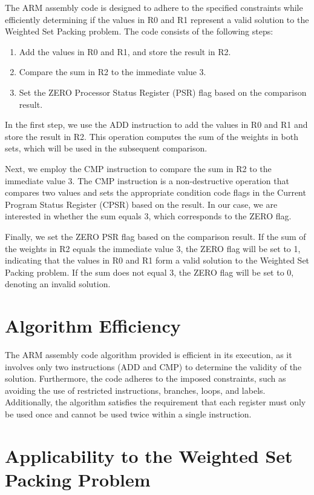 The ARM assembly code is designed to adhere to the specified constraints while efficiently determining if the values in R0 and R1 represent a valid solution to the Weighted Set Packing problem. The code consists of the following steps:

\begin{enumerate}
    \item Add the values in R0 and R1, and store the result in R2.
    \item Compare the sum in R2 to the immediate value 3.
    \item Set the ZERO Processor Status Register (PSR) flag based on the comparison result.
\end{enumerate}

In the first step, we use the ADD instruction to add the values in R0 and R1 and store the result in R2. This operation computes the sum of the weights in both sets, which will be used in the subsequent comparison.

Next, we employ the CMP instruction to compare the sum in R2 to the immediate value 3. The CMP instruction is a non-destructive operation that compares two values and sets the appropriate condition code flags in the Current Program Status Register (CPSR) based on the result. In our case, we are interested in whether the sum equals 3, which corresponds to the ZERO flag.

Finally, we set the ZERO PSR flag based on the comparison result. If the sum of the weights in R2 equals the immediate value 3, the ZERO flag will be set to 1, indicating that the values in R0 and R1 form a valid solution to the Weighted Set Packing problem. If the sum does not equal 3, the ZERO flag will be set to 0, denoting an invalid solution.

\section{Algorithm Efficiency}

The ARM assembly code algorithm provided is efficient in its execution, as it involves only two instructions (ADD and CMP) to determine the validity of the solution. Furthermore, the code adheres to the imposed constraints, such as avoiding the use of restricted instructions, branches, loops, and labels. Additionally, the algorithm satisfies the requirement that each register must only be used once and cannot be used twice within a single instruction.

\section{Applicability to the Weighted Set Packing Problem}

